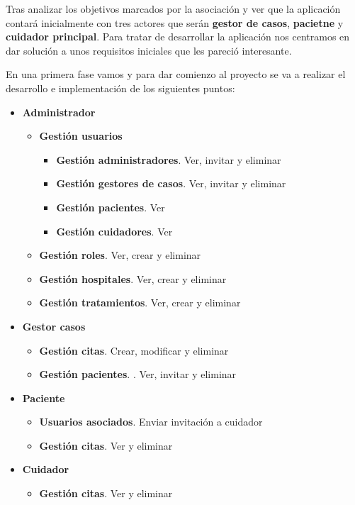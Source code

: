 Tras analizar los objetivos marcados por la asociación y ver que la aplicación contará inicialmente con tres actores que serán \textbf{gestor de casos}, \textbf{pacietne} y \textbf{cuidador principal}. Para tratar de desarrollar la aplicación nos centramos en dar solución a unos requisitos iniciales que les pareció interesante. 

En una primera fase vamos y para dar comienzo al proyecto se va a realizar el desarrollo e implementación de los siguientes puntos:
\begin{itemize}
\item \textbf{Administrador}
	\begin{itemize}
		\item \textbf{Gestión usuarios}
			\begin{itemize}
				\item \textbf{Gestión administradores}. Ver, invitar y eliminar
				\item \textbf{Gestión gestores de casos}. Ver, invitar y eliminar
				\item \textbf{Gestión pacientes}. Ver
				\item \textbf{Gestión cuidadores}. Ver
			\end{itemize}
		\item \textbf{Gestión roles}. Ver, crear y eliminar
		\item \textbf{Gestión hospitales}. Ver, crear y eliminar
		\item \textbf{Gestión tratamientos}. Ver, crear y eliminar
	\end{itemize}
\item \textbf{Gestor casos}
			\begin{itemize}
				\item \textbf{Gestión citas}. Crear, modificar y eliminar
				\item \textbf{Gestión pacientes}. . Ver, invitar y eliminar
			\end{itemize}
\item \textbf{Paciente}
			\begin{itemize}
				\item \textbf{Usuarios asociados}. Enviar invitación a cuidador
				\item \textbf{Gestión citas}. Ver y eliminar
			\end{itemize}
\item \textbf{Cuidador}
			\begin{itemize}
				\item \textbf{Gestión citas}. Ver y eliminar
			\end{itemize}
\end{itemize}


